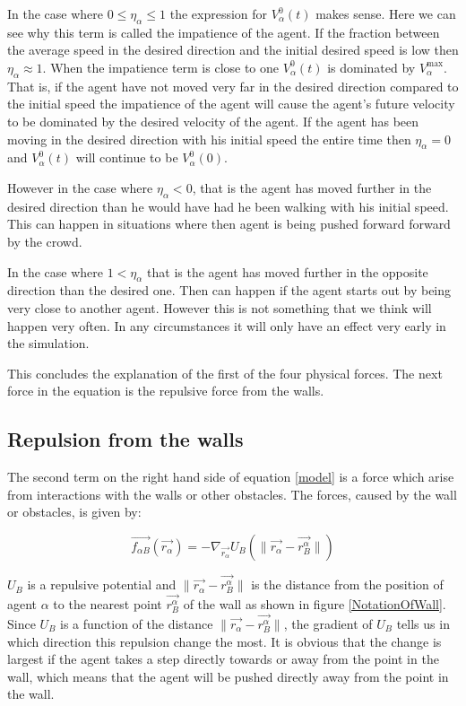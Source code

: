 In the case where $0 \leq \eta_{\alpha} \leq 1$ the expression for 
$V_{\alpha}^{0} \left( t \right)$ makes sense. Here we can see why this term 
is called the impatience of the agent. If the fraction  between the average 
speed in the desired direction and the initial desired speed is low then 
$\eta_{\alpha} \approx 1$. 
When the impatience term is close to one $V_{\alpha}^{0} \left( t \right)$ is 
dominated by $V_{\alpha}^{\text{max}}$. That is, if the agent have not moved 
very far in the desired direction compared to the initial speed the impatience 
of the agent will cause the agent's future velocity to be dominated by the 
desired velocity of the agent. 
If the agent has been moving in the desired direction with his initial speed 
the entire time then $\eta_{\alpha} = 0$  and $V_{\alpha}^{0} \left( t 
\right)$ will continue to be $V_{\alpha}^{0} \left( 0 \right)$. 

However in the case where $\eta_{\alpha} < 0$, that is the agent has moved 
further in the desired direction than he would have had he been walking with his 
initial speed. This can happen in situations where then agent is being pushed 
forward forward by the crowd.

In the case where $1 < \eta_{\alpha}$ that is the agent has moved further 
in the opposite direction than the desired one. Then can happen if the agent 
starts out by being very close to another agent. However this is not something 
that we think will happen very often. In any circumstances it will only have an 
effect very early in the simulation. 

This concludes the explanation of the first of the four physical forces. The next 
force in the equation is the repulsive force from the walls.

\subsection{Repulsion from the walls}
The second term on the right hand side of equation \eqref{model} is a force which 
arise from interactions with the walls or other obstacles. The forces, caused by the 
wall or obstacles, is given by:

\begin{equation}\label{wallpotential}
    \vec{f_{\alpha B}} \left( \vec{r_{\alpha}} \right) =
    - \nabla_{\vec{r_{\alpha}}} U_{B}
    \left( \| \vec{r_{\alpha}} - \vec{r_{B}^{\alpha}} \| \right)
\end{equation}

$U_B$ is a repulsive potential and $\|\vec{r_{\alpha}} - \vec{r_{B}^{\alpha}}\|$ 
is the distance from the position of agent $\alpha$ to the nearest point $\vec{r_{B}^{\alpha}} $ 
of the wall as shown in figure \ref{NotationOfWall}. Since $U_B$ is a function of the distance 
$\| \vec{r_{\alpha}} - \vec{r_{B}^{\alpha}} \|$, the gradient of $U_B$ tells us in 
which direction this repulsion change the most. It is obvious that the change is 
largest if the agent takes a step directly towards or away from the point in the wall, 
which means that the agent will be pushed directly away from the point in the wall.

